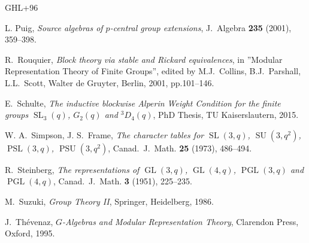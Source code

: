 \documentclass[12pt,a4paper]{amsart}
\theoremstyle{plain}\newtheorem{Theorem}{Theorem}[section]
\theoremstyle{plain}\newtheorem{Conjecture}[Theorem]{Conjecture}
\theoremstyle{plain}\newtheorem{Corollary}[Theorem]{Corollary}
\theoremstyle{plain}\newtheorem{Lemma}[Theorem]{Lemma}
\theoremstyle{plain}\newtheorem{Proposition}[Theorem]{Proposition}
\theoremstyle{definition}\newtheorem{Definition}[Theorem]{Definition}
\theoremstyle{definition}\newtheorem{Example}[Theorem]{Example}
\theoremstyle{definition}\newtheorem{Examples}[Theorem]{Examples}
\theoremstyle{definition}\newtheorem{Remark}[Theorem]{Remark}
\theoremstyle{definition}\newtheorem{Question}[Theorem]{Question}
\theoremstyle{definition}\newtheorem{Notation}[Theorem]{Notation}
\theoremstyle{definition}\newtheorem{Hypothesis}[Theorem]{Hypothesis}
\theoremstyle{definition}\newtheorem{Assumption}[Theorem]{Assumption}
\theoremstyle{definition}\newtheorem{Strategy}[Theorem]{Strategy}
\theoremstyle{definition}\newtheorem{Contents}[Theorem]{Contents}
\theoremstyle{definition}\newtheorem{Computations}[Theorem]{Computations}
\theoremstyle{definition}\newtheorem{Equivalences}[Theorem]{Equivalences}
\theoremstyle{definition}\newtheorem{Notation/Definition}[Theorem]{Notation/Definition}
\theoremstyle{definition}\newtheorem{noth}[Theorem]{}
\theoremstyle{plain}\newtheorem{Step}[Theorem]{Step}
\newcommand{\PSL}{\operatorname{PSL}}
\newcommand{\SL}{\operatorname{SL}}
\newcommand{\PGL}{\operatorname{PGL}}
\newcommand{\GL}{\operatorname{GL}}
\newcommand{\PSU}{\operatorname{PSU}}
\newcommand{\SU}{\operatorname{SU}}
\begin{document}
\begin{thebibliography}{GHL+96}




 {\sc L. Puig}, 
\emph{Source algebras of $p$-central group extensions},
J.~Algebra \textbf{235} (2001), 359--398.


{\sc R.~Rouquier}, 
\emph{Block theory via stable and Rickard equivalences},
in ''Modular Representation Theory of Finite Groups'',
edited by M.J.~Collins, B.J.~Parshall, L.L.~Scott,
Walter de Gruyter, Berlin, 2001, pp.101--146.


{\sc E.~Schulte},
\emph{
The inductive blockwise Alperin Weight Condition for the finite groups 
$\SL_{3}(q)$, $G_{2}(q)$ and $^{3}\!D_{4}(q)$}, 
PhD Thesis, TU Kaiserslautern, 2015.

{\sc W. A.~Simpson, J. S.~Frame},
\emph{The character tables for $\SL(3,q)$, $\SU(3,q^2)$, $\PSL(3,q)$, $\PSU(3,q^2)$},
Canad.~J.~Math. \textbf{25} (1973), 486--494. 

 {\sc R.~Steinberg},
\emph{The representations of $\GL(3, q)$, $ \GL(4,q)$, $\PGL(3,q)$
and $\PGL(4,q)$},
Canad.~J.~Math. \textbf{3} (1951), 225--235.

{\sc M.~Suzuki},
\emph{Group Theory II},
Springer, Heidelberg, 1986.


 {\sc J.~Th\'{e}venaz},
\emph{$G$-Algebras and Modular Representation Theory}, Clarendon Press, Oxford,
1995.



\end{thebibliography}
\end{document}
